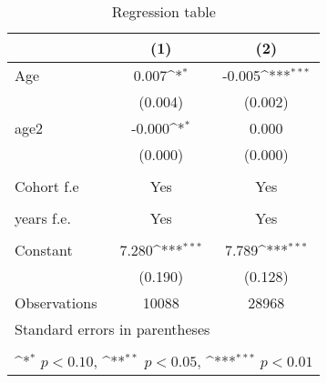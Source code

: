 \begin{table}[htbp]\centering
\def\sym#1{\ifmmode^{#1}\else\(^{#1}\)\fi}
\caption{Regression table \label{reg3}}
\begin{tabular}{l*{2}{c}}
\toprule
                    &\multicolumn{1}{c}{(1)}         &\multicolumn{1}{c}{(2)}         \\
\midrule
Age                 &       0.007\sym{*}  &      -0.005\sym{***}\\
                    &     (0.004)         &     (0.002)         \\
\addlinespace
age2                &      -0.000\sym{*}  &       0.000         \\
                    &     (0.000)         &     (0.000)         \\
\\
Cohort f.e           &       Yes        &      Yes \\
                            \\
\addlinespace
years f.e.            &       Yes         &       Yes         \\
                           \\
\addlinespace
Constant            &       7.280\sym{***}&       7.789\sym{***}\\
                    &     (0.190)         &     (0.128)         \\
\midrule
Observations        &       10088         &       28968         \\
\bottomrule
\multicolumn{3}{l}{\footnotesize Standard errors in parentheses}\\
\multicolumn{3}{l}{\footnotesize }\\
\multicolumn{3}{l}{\footnotesize \sym{*} \(p<0.10\), \sym{**} \(p<0.05\), \sym{***} \(p<0.01\)}\\
\end{tabular}
\end{table}
